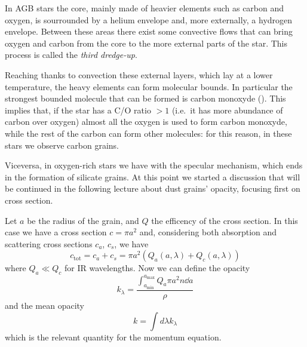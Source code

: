 \documentclass[main.tex]{subfiles}
\begin{document}
In AGB stars the core, mainly made of heavier elements such as carbon and oxygen, is sourrounded by a helium envelope and, more externally, a hydrogen envelope. 
Between these areas there exist some convective flows that can bring oxygen and carbon from the core to the more external parts of the star. 
This process is called the \emph{third dredge-up}.

Reaching thanks to convection these external layers, which lay at a lower temperature, the heavy elements can form molecular bounds.
In particular the strongest bounded molecule that can be formed is carbon monoxyde ().
This implies that, if the star has a C/O ratio $>1$ (i.e.\ it has more abundance of carbon over oxygen) almost all the oxygen is used to form carbon monoxyde, while the rest of the carbon can form other molecules: for this reason, in these stars we observe carbon grains.

Viceversa, in oxygen-rich stars we have with the specular mechanism, which ends in the formation of silicate grains.
At this point we started a discussion that will be continued in the following lecture about dust grains' opacity, focusing first on cross section.

Let $a$ be the radius of the grain, and $Q$ the efficency of the cross section. In this case we have a cross section $c=\pi a^2$ and, considering both absorption and scattering cross sections $c_a$, $c_s$, we have
%
\begin{equation}
c_{\text{tot}}
=c_a+c_s
=\pi a^2(Q_a(a,\lambda)+Q_c(a,\lambda))
\end{equation}
%
where $Q_a \ll Q_c$ for IR wavelengths.
Now we can define the opacity
%
\begin{equation}
k_\lambda=\frac{\int_{a_{\text{min}}}^{a_{\text{max}}}Q_a\pi a^2 n \dd{a}}{\rho}
\end{equation}
%
and the mean opacity
%
\begin{equation}
k=\int d\lambda k_\lambda
\end{equation}
%
which is the relevant quantity for the momentum equation.
\end{document}
